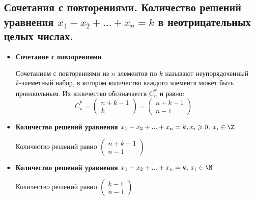 \subsection{Сочетания с повторениями. Количество решений уравнения $x_1 + x_2 + . . . + x_n = k$ в неотрицательных целых числах.}
\begin{itemize}
	\item \textbf{Сочетание с повторениями}
	
	Сочетанием с повторениями из $n$ элементов по $k$ называют неупорядоченный $k$-элеметный набор, в котором количество каждого элемента может быть произвольным. Их количество обозначается $\overline C^k_n$ и равно:
	$$\overline C^k_n = \begin{pmatrix}n+k-1\\k\end{pmatrix} = \begin{pmatrix}n+k-1\\n-1\end{pmatrix}$$
	
	\item \textbf{Количество решений уравнения $x_1 + x_2 + ... + x_n = k, x_i \geqslant 0, \: x_i \in \Z$}
	
	Количество решений равно $\displaystyle \begin{pmatrix}n+k-1\\n - 1\end{pmatrix}$

	\item \textbf{Количество решений уравнения $x_1 + x_2 + ... + x_n = k, \: x_i \in \N$}
	
	Количество решений равно $\displaystyle \begin{pmatrix}k-1\\n - 1\end{pmatrix}$
\end{itemize}